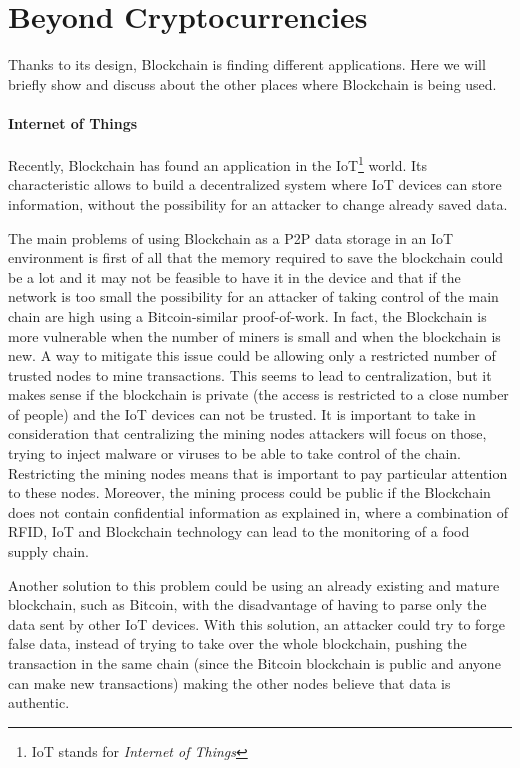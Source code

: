 \section{Beyond Cryptocurrencies}
\label{sec:beyond_crypto}

Thanks to its design, Blockchain is finding different applications. Here
we will briefly show and discuss about the other places where Blockchain
is being used.

\paragraph*{Internet of Things}

Recently, Blockchain has found an application in the IoT\footnote{IoT stands
for \textit{Internet of Things}} world\cite{politecnico16}. Its characteristic
allows to build a decentralized system where IoT devices can store information,
without the possibility for an attacker to change already saved
data\cite{politecnico16}.

The main problems of using Blockchain as a P2P data storage in an IoT
environment is first of all that the memory required to save the blockchain
could be a lot and it may not be feasible to have it in the device and that if
the network is too small the possibility for an attacker of taking control of
the main chain are high using a Bitcoin-similar proof-of-work. In fact, the
Blockchain is more vulnerable when the number of miners is small and when the
blockchain is new. A way to mitigate this issue could be allowing only a
restricted number of trusted nodes to mine transactions. This seems to lead to
centralization, but it makes sense if the blockchain is private (the access is
restricted to a close number of people) and the IoT devices can not be trusted.
It is important to take in consideration that centralizing the mining nodes
attackers will focus on those, trying to inject malware or viruses to be able to
take control of the chain. Restricting the mining nodes means that is important
to pay particular attention to these nodes.
Moreover, the mining process could be public if the Blockchain does not contain
confidential information as explained in\cite{tian17}, where a combination of
RFID, IoT and Blockchain technology can lead to the monitoring of a food supply
chain.

Another solution to this problem could be using an already existing and mature
blockchain, such as Bitcoin, with the disadvantage of having to parse only
the data sent by other IoT devices. With this solution, an attacker could try to
forge false data, instead of trying to take over the whole blockchain,
pushing the transaction in the same chain (since the Bitcoin blockchain is
public and anyone can make new transactions) making the other nodes believe
that data is authentic.

